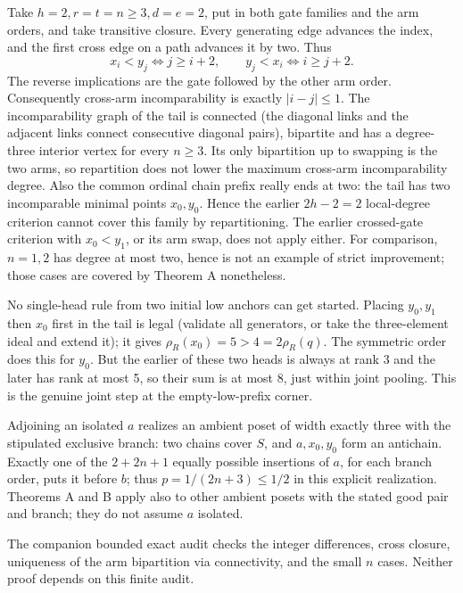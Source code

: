\documentclass[
  11pt,
]{article}
\begin{document}
Take \(h=2, r=t=n\ge3, d=e=2\), put in both gate families and the arm
orders, and take transitive closure. Every generating edge advances the
index, and the first cross edge on a path advances it by two. Thus \[
 x_i<y_j\iff j\ge i+2,\qquad y_j<x_i\iff i\ge j+2.
\] The reverse implications are the gate followed by the other arm
order. Consequently cross-arm incomparability is exactly \(|i-j|\le1\).
The incomparability graph of the tail is connected (the diagonal links
and the adjacent links connect consecutive diagonal pairs), bipartite
and has a degree-three interior vertex for every \(n\ge3\). Its only
bipartition up to swapping is the two arms, so repartition does not
lower the maximum cross-arm incomparability degree. Also the common
ordinal chain prefix really ends at two: the tail has two incomparable
minimal points \(x_0,y_0\). Hence the earlier \(2h-2=2\) local-degree
criterion cannot cover this family by repartitioning. The earlier
crossed-gate criterion with \(x_0<y_1\), or its arm swap, does not apply
either. For comparison, \(n=1,2\) has degree at most two, hence is not
an example of strict improvement; those cases are covered by Theorem A
nonetheless.

No single-head rule from two initial low anchors can get started.
Placing \(y_0,y_1\) then \(x_0\) first in the tail is legal (validate
all generators, or take the three-element ideal and extend it); it gives
\(\rho_R(x_0)=5>4=2\rho_R(q)\). The symmetric order does this for
\(y_0\). But the earlier of these two heads is always at rank 3 and the
later has rank at most 5, so their sum is at most 8, just within joint
pooling. This is the genuine joint step at the empty-low-prefix corner.

Adjoining an isolated \(a\) realizes an ambient poset of width exactly
three with the stipulated exclusive branch: two chains cover \(S\), and
\(a,x_0,y_0\) form an antichain. Exactly one of the \(2+2n+1\) equally
possible insertions of \(a\), for each branch order, puts it before
\(b\); thus \(p=1/(2n+3)\le1/2\) in this explicit realization. Theorems
A and B apply also to other ambient posets with the stated good pair and
branch; they do not assume \(a\) isolated.

The companion bounded exact audit checks the integer differences, cross
closure, uniqueness of the arm bipartition via connectivity, and the
small \(n\) cases. Neither proof depends on this finite audit.
\end{document}
